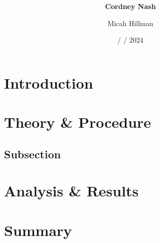 \documentclass[a4paper,12pt,english]{all-in-one} %
\title{{\large\textit{}}\\[0.5cm]{\Huge\color{gray}\textsc{\@docsubtitle}}}
\author{\textbf{Cordney Nash}  \and Micah Hillman  }
\date{/ / 2024}
\begin{document}
\begin{titlepage}
\maketitle\vfill
\end{titlepage}
\newpage


\section*{Introduction}
\lipsum[1]


\begin{multicols}{2}

\section*{Theory \& Procedure}

    \subsection*{Subsection}
    \lipsum[4-8] 
    
\section*{Analysis \& Results}
    \lipsum[10-13]

\end{multicols}

\section*{Summary}
        \lipsum[14]
        \lipsum[15]
\end{document}
